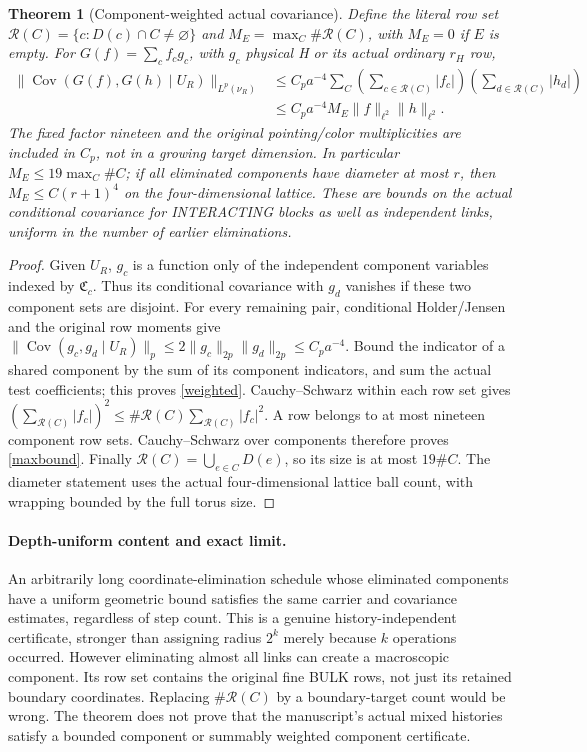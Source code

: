\documentclass[11pt]{article}
\newtheorem{theorem}{Theorem}
\newcommand{\Cov}{\operatorname{Cov}}
\begin{document}
\begin{theorem}[Component-weighted actual covariance]
Define the literal row set $\mathcal R(C)=\{c:D(c)\cap C\ne\varnothing\}$ and
$M_E=\max_C\#\mathcal R(C)$, with $M_E=0$ if $E$ is empty.
For $G(f)=\sum_cf_cg_c$, with $g_c$ physical H or its actual ordinary $r_H$ row,
\begin{align}
 \|\Cov(G(f),G(h)\mid U_R)\|_{L^p(\nu_R)}
 &\le C_pa^{-4}\sum_C
       \left(\sum_{c\in\mathcal R(C)}|f_c|\right)
       \left(\sum_{d\in\mathcal R(C)}|h_d|\right)\label{weighted}\\
 &\le C_pa^{-4}M_E\|f\|_{\ell^2}\|h\|_{\ell^2}.\label{maxbound}
\end{align}
The fixed factor nineteen and the original pointing/color multiplicities are included in
$C_p$, not in a growing target dimension. In particular
$M_E\le19\max_C\#C$; if all eliminated components have diameter at most $r$,
then $M_E\le C(r+1)^4$ on the four-dimensional lattice.
These are bounds on the actual conditional covariance for INTERACTING blocks as well as
independent links, uniform in the number of earlier eliminations.
\end{theorem}
\begin{proof}
Given $U_R$, $g_c$ is a function only of the independent component variables indexed by
$\mathfrak C_c$. Thus its conditional covariance with $g_d$ vanishes if these two component
sets are disjoint. For every remaining pair, conditional Holder/Jensen and the original
row moments give
$\|\Cov(g_c,g_d\mid U_R)\|_p\le2\|g_c\|_{2p}\|g_d\|_{2p}\le C_pa^{-4}$.
Bound the indicator of a shared component by the sum of its component indicators, and
sum the actual test coefficients; this proves \eqref{weighted}.
Cauchy--Schwarz within each row set gives
$(\sum_{\mathcal R(C)}|f_c|)^2\le\#\mathcal R(C)\sum_{\mathcal R(C)}|f_c|^2$.
A row belongs to at most nineteen component row sets. Cauchy--Schwarz over components
therefore proves \eqref{maxbound}. Finally $\mathcal R(C)=\bigcup_{e\in C}D(e)$,
so its size is at most $19\#C$. The diameter statement uses the actual four-dimensional
lattice ball count, with wrapping bounded by the full torus size.
\end{proof}

\paragraph{Depth-uniform content and exact limit.}
An arbitrarily long coordinate-elimination schedule whose eliminated components have a
uniform geometric bound satisfies the same carrier and covariance estimates, regardless
of step count. This is a genuine history-independent certificate, stronger than assigning
radius $2^k$ merely because $k$ operations occurred.
However eliminating almost all links can create a macroscopic component. Its row set
contains the original fine BULK rows, not just its retained boundary coordinates.
Replacing $\#\mathcal R(C)$ by a boundary-target count would be wrong.
The theorem does not prove that the manuscript's actual mixed histories satisfy a bounded
component or summably weighted component certificate.
\end{document}
